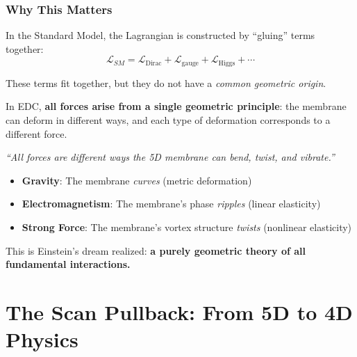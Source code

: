 \subsubsection{Why This Matters}

In the Standard Model, the Lagrangian is constructed by ``gluing'' terms together:
\begin{equation}
\mathcal{L}_{SM} = \mathcal{L}_{\text{Dirac}} + \mathcal{L}_{\text{gauge}} + \mathcal{L}_{\text{Higgs}} + \cdots
\end{equation}

These terms fit together, but they do not have a \textit{common geometric origin}.

In EDC, \textbf{all forces arise from a single geometric principle}: the membrane can deform in different ways, and each type of deformation corresponds to a different force.

\begin{tcolorbox}[colback=blue!5,colframe=blue!70!black,title=The Geometric Theory of Everything]
\begin{center}
\textit{``All forces are different ways the 5D membrane can bend, twist, and vibrate.''}
\end{center}

\vspace{0.5em}

\begin{itemize}
    \item \textbf{Gravity}: The membrane \textit{curves} (metric deformation)
    \item \textbf{Electromagnetism}: The membrane's phase \textit{ripples} (linear elasticity)
    \item \textbf{Strong Force}: The membrane's vortex structure \textit{twists} (nonlinear elasticity)
\end{itemize}

\vspace{0.5em}

This is Einstein's dream realized: \textbf{a purely geometric theory of all fundamental interactions.}
\end{tcolorbox}

\newpage

\section{The Scan Pullback: From 5D to 4D Physics}
\label{sec:scan_pullback}

